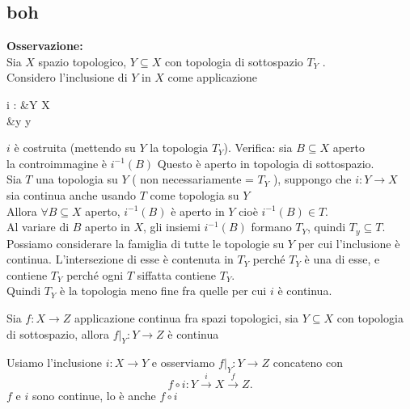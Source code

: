 \documentclass{article}
\begin{document}

\maketitle
	\newpage
	\subsection{boh}
	\textbf{Osservazione:}\\
	Sia $X$ spazio topologico, $Y\subseteq X$ con topologia di sottospazio $T_Y$ .\\
	Considero l'inclusione di $Y$ in $X$ come applicazione

	\begin{center}
		\begin{aligned}
			i : &Y \rightarrow X\\
			    &y \rightarrow y
		\end{aligned}
	\end{center}
	$i$ è costruita (mettendo su $Y$ la topologia $T_Y$). Verifica: sia  $B\subseteq X$ aperto\\
	la controimmagine è $i^{-1}(B)$ Questo è aperto in topologia di sottospazio.\\
	Sia  $T$ una topologia su $Y$ ( non necessariamente = $T_Y$ ), suppongo che $i: Y \rightarrow X $ sia continua anche usando $T$ come topologia su $Y$ \\
	Allora $\forall B\subseteq X$ aperto, $i^{-1}(B)$ è aperto in $Y$ cioè $i^{-1}(B)\in T$. \\
	Al variare di $B$ aperto in $X$, gli insiemi $i^{-1}(B)$ formano  $T_Y$, quindi $T_y \subseteq T$.\\
	Possiamo considerare la famiglia di tutte le topologie su  $Y$ per cui l'inclusione è continua. L'intersezione di esse è contenuta in $T_Y$  perché $ T_Y$ è una di esse, e contiene $T_Y$ perché ogni $T$ siffatta contiene $T_Y$. \\
	Quindi $T_Y$ è la topologia meno fine fra quelle per cui $i$ è continua. 
	\begin{prop}
		Sia $f: X \rightarrow Z$ applicazione continua fra spazi topologici, sia $Y\subseteq X$ con topologia di sottospazio, allora $f|_Y:Y \rightarrow Z$ è continua
	\end{prop}
	\begin{dimo}
		Usiamo l'inclusione $i:X \rightarrow Y$ e osserviamo $f|_Y:Y \rightarrow Z$ concateno con\\
		 \[
			 f\circ i: Y \xrightarrow{i} X \xrightarrow{f} Z
		.\] 
		$f$ e $i$ sono continue, lo è anche $f\circ i$
	\end{dimo}
\end{document}
